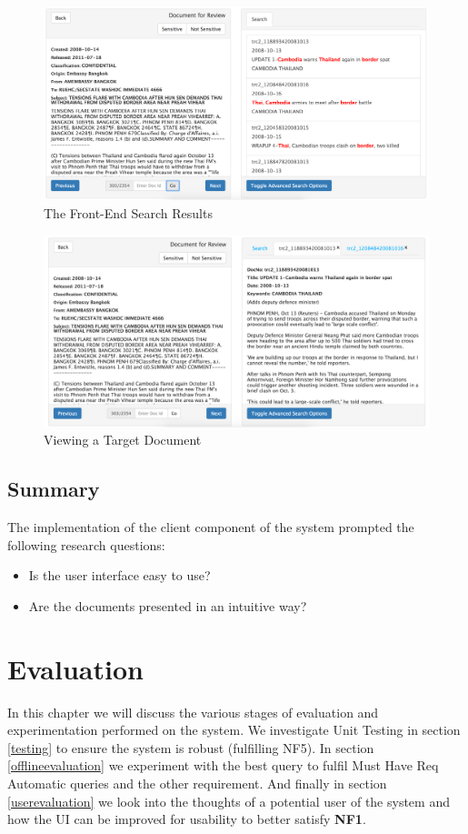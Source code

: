 \documentclass{l4proj}
\begin{document}
\begin{figure}[H]
\centering
\includegraphics[scale=0.30]{images/searchresults}
\caption{The Front-End Search Results}
\label{relevant_results_full}
\end{figure}
\begin{figure}[H]
\centering
\includegraphics[scale=0.30]{images/targetdocument}
\caption{Viewing a Target Document}
\label{target_doc_view}
\end{figure}

\section{Summary} \label{clientsummary}
The implementation of the client component of the system prompted the following research questions:
\begin{itemize}
\item Is the user interface easy to use?
\item Are the documents presented in an intuitive way?
\end{itemize}

\chapter{Evaluation} \label{evaluation}
In this chapter we will discuss the various stages of evaluation and experimentation performed on the system.
We investigate Unit Testing in section \ref{testing} to ensure the system is robust (fulfilling NF5).
In section \ref{offlineevaluation} we experiment with the best query to fulfil Must Have Req Automatic queries  and the other requirement.
And finally in section \ref{userevaluation} we look into the thoughts of a potential user of the system and how the UI can be improved for usability to better satisfy \textbf{NF1}.
\end{document}
